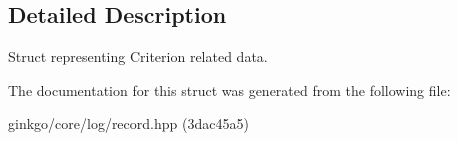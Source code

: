 \subsection{Detailed Description}
Struct representing Criterion related data. 

The documentation for this struct was generated from the following file\+:\begin{DoxyCompactItemize}
\item 
ginkgo/core/log/record.\+hpp (3dac45a5)\end{DoxyCompactItemize}
